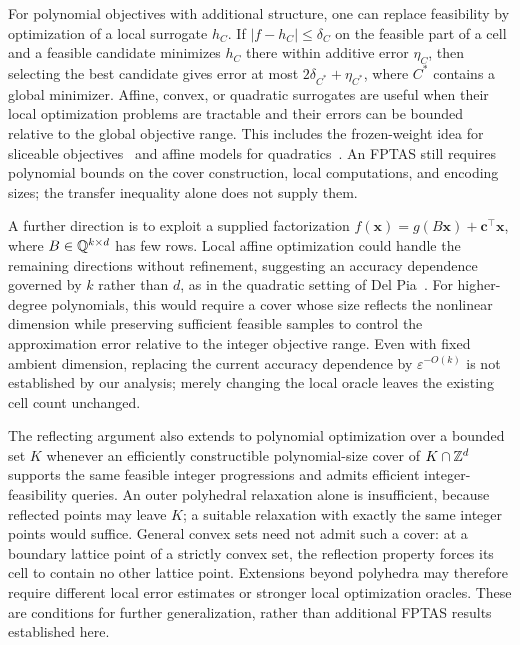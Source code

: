 \documentclass[11pt]{article}
\theoremstyle{definition}\newtheorem{definition}{Definition}[section]
\theoremstyle{remark}\newtheorem{remark}[theorem]{Remark}
\newcommand{\eps}{\varepsilon}
\begin{document}
For polynomial objectives with additional structure, one can replace feasibility by optimization of a local surrogate $h_C$. If $|f-h_C|\le\delta_C$ on the feasible part of a cell and a feasible candidate minimizes $h_C$ there within additive error $\eta_C$, then selecting the best candidate gives error at most $2\delta_{C^*}+\eta_{C^*}$, where $C^*$ contains a global minimizer. Affine, convex, or quadratic surrogates are useful when their local optimization problems are tractable and their errors can be bounded relative to the global objective range. This includes the frozen-weight idea for sliceable objectives~\cite{HWZ} and affine models for quadratics~\cite{DelPia}. An FPTAS still requires polynomial bounds on the cover construction, local computations, and encoding sizes; the transfer inequality alone does not supply them.

A further direction is to exploit a supplied factorization $f(\mathbf{x})=g(B\mathbf{x})+\mathbf c^\top\mathbf{x}$, where $B\in\mathbb Q^{k\times d}$ has few rows. Local affine optimization could handle the remaining directions without refinement, suggesting an accuracy dependence governed by $k$ rather than $d$, as in the quadratic setting of Del Pia~\cite{DelPia}. For higher-degree polynomials, this would require a cover whose size reflects the nonlinear dimension while preserving sufficient feasible samples to control the approximation error relative to the integer objective range. Even with fixed ambient dimension, replacing the current accuracy dependence by $\eps^{-O(k)}$ is not established by our analysis; merely changing the local oracle leaves the existing cell count unchanged.

The reflecting argument also extends to polynomial optimization over a bounded set $K$ whenever an efficiently constructible polynomial-size cover of $K\cap\mathbb Z^d$ supports the same feasible integer progressions and admits efficient integer-feasibility queries. An outer polyhedral relaxation alone is insufficient, because reflected points may leave $K$; a suitable relaxation with exactly the same integer points would suffice. General convex sets need not admit such a cover: at a boundary lattice point of a strictly convex set, the reflection property forces its cell to contain no other lattice point. Extensions beyond polyhedra may therefore require different local error estimates or stronger local optimization oracles. These are conditions for further generalization, rather than additional FPTAS results established here.
\end{document}
